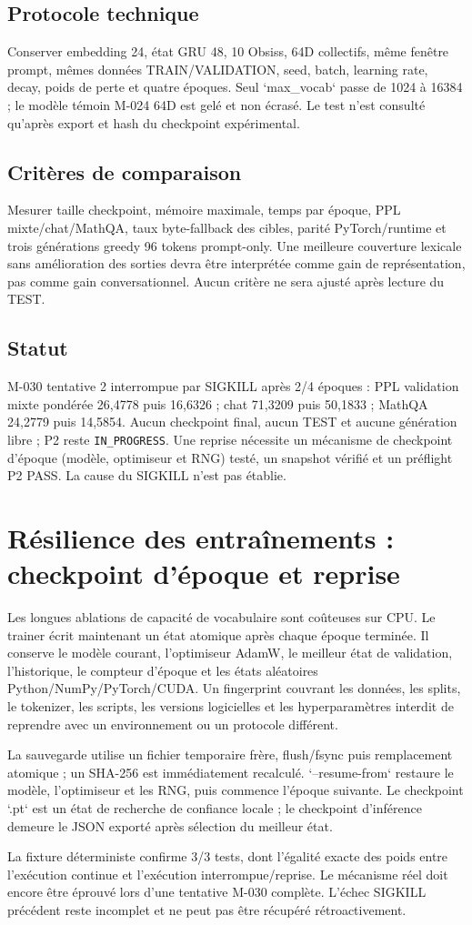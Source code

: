 \documentclass[11pt,a4paper]{report}
\begin{document}
\subsection{Protocole technique}
Conserver embedding 24, état GRU 48, 10 Obsiss, 64D collectifs, même fenêtre prompt, mêmes données TRAIN/VALIDATION, seed, batch, learning rate, decay, poids de perte et quatre époques. Seul `max\_vocab` passe de 1024 à 16384 ; le modèle témoin M-024 64D est gelé et non écrasé. Le test n'est consulté qu'après export et hash du checkpoint expérimental.

\subsection{Critères de comparaison}
Mesurer taille checkpoint, mémoire maximale, temps par époque, PPL mixte/chat/MathQA, taux byte-fallback des cibles, parité PyTorch/runtime et trois générations greedy 96 tokens prompt-only. Une meilleure couverture lexicale sans amélioration des sorties devra être interprétée comme gain de représentation, pas comme gain conversationnel. Aucun critère ne sera ajusté après lecture du TEST.

\subsection{Statut}
M-030 tentative 2 interrompue par SIGKILL après 2/4 époques : PPL validation mixte pondérée 26,4778 puis 16,6326 ; chat 71,3209 puis 50,1833 ; MathQA 24,2779 puis 14,5854. Aucun checkpoint final, aucun TEST et aucune génération libre ; P2 reste \texttt{IN\_PROGRESS}. Une reprise nécessite un mécanisme de checkpoint d'époque (modèle, optimiseur et RNG) testé, un snapshot vérifié et un préflight P2 PASS. La cause du SIGKILL n'est pas établie.


\section{Résilience des entraînements : checkpoint d’époque et reprise}
Les longues ablations de capacité de vocabulaire sont coûteuses sur CPU. Le trainer écrit maintenant un état atomique après chaque époque terminée. Il conserve le modèle courant, l’optimiseur AdamW, le meilleur état de validation, l’historique, le compteur d’époque et les états aléatoires Python/NumPy/PyTorch/CUDA. Un fingerprint couvrant les données, les splits, le tokenizer, les scripts, les versions logicielles et les hyperparamètres interdit de reprendre avec un environnement ou un protocole différent.

La sauvegarde utilise un fichier temporaire frère, flush/fsync puis remplacement atomique ; un SHA-256 est immédiatement recalculé. `--resume-from` restaure le modèle, l’optimiseur et les RNG, puis commence l’époque suivante. Le checkpoint `.pt` est un état de recherche de confiance locale ; le checkpoint d’inférence demeure le JSON exporté après sélection du meilleur état.

La fixture déterministe confirme 3/3 tests, dont l’égalité exacte des poids entre l’exécution continue et l’exécution interrompue/reprise. Le mécanisme réel doit encore être éprouvé lors d’une tentative M-030 complète. L’échec SIGKILL précédent reste incomplet et ne peut pas être récupéré rétroactivement.
\end{document}
